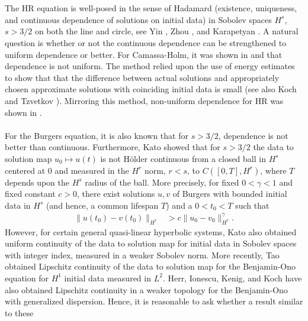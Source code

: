 \documentclass[12pt,reqno]{amsart}
\numberwithin{equation}{section}  %
\numberwithin{figure}{section}
\begin{document}
\\
\\
The HR equation is well-posed in the sense of Hadamard (existence, uniqueness,
and continuous dependence of solutions on initial data) in Sobolev spaces
$H^{s}$, $s > 3/2$ on both the line and circle, see Yin
\cite{Yin_2003_On-the-Cauchy-p}, Zhou \cite{Zhou_2005_Local-well-pose}, and
Karapetyan \cite{Karapetyan:2010fk}. A natural question is whether or not the
continuous dependence can be strengthened to uniform dependence or better. For
Camassa-Holm, it was shown in \cite{Himonas:2009fk} and \cite{Himonas:2010p1187} 
that dependence is not uniform. The method relied upon the use of energy
estimates to show that that the difference between actual solutions and appropriately chosen approximate solutions with coinciding initial data is small (see
also Koch and Tzvetkov \cite{Koch_2005_Nonlinear-wave-}). Mirroring this method,
non-uniform dependence for HR was shown in \cite{Karapetyan:2010fk}. 
\\
\\
For the Burgers equation, it is also known that for $s > 3/2$, dependence is not
better than continuous. Furthermore, Kato \cite{Kato_1975_Quasi-linear-eq}
showed that for $s > 3/2$ the data to solution map $u_{0} \mapsto u(t)$ is not
H\"older continuous from a closed ball in $H^{s}$ centered at $0$ and measured
in the $H^{r}$ norm, $r < s$, to $C([0, T], H^{r})$, where $T$ depends upon
the $H^{s}$ radius of the ball. More precisely, for fixed $0 < \gamma < 1$
and fixed constant $c > 0$,
there exist solutions $u, v$ of Burgers with bounded initial data in $H^{s}$
(and hence, a common lifespan $T$) and a $0 < t_{0} < T$ such that
%
%
\begin{equation*}
\begin{split}
\| u(t_{0}) - v(t_{0}) \|_{H^{r}} 
& > c \| u_{0} - v_{0} \|^{\gamma}_{H^{r}}.
\end{split}
\end{equation*}
However, for certain general quasi-linear hyperbolic systems, Kato also obtained
uniform continuity of the data to solution map for initial data in Sobolev
spaces with integer index, measured in a weaker Sobolev norm. More recently, Tao
\cite{Tao:2004p1537} obtained Lipschitz continuity of the data to solution map
for the Benjamin-Ono equation for $H^{1}$ initial data measured in $L^{2}$.
Herr, Ionescu, Kenig, and Koch \cite{Herr:2010p886} have also obtained Lipschitz
continuity in a weaker topology for the Benjamin-Ono with generalized
dispersion. Hence, it is reasonable to ask whether a result similar to these
\end{document}
